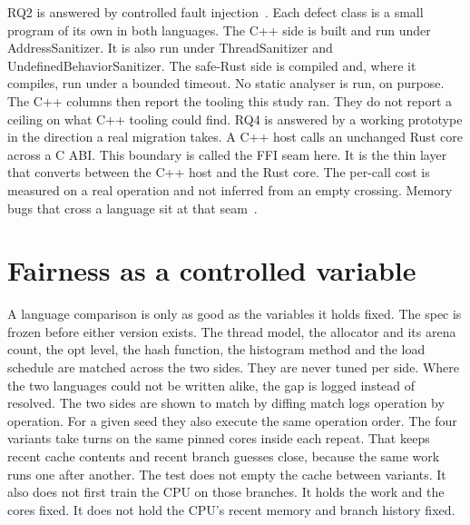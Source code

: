 \documentclass[english,oneside,a4paper,censored,csm,software-track-2020]{HYthesisML}
\begin{document}
RQ2 is answered by controlled fault injection~\cite{natella2016fault}. Each
defect class is a small program of its own in both languages.
The C++ side is built and run under AddressSanitizer. It is also run under
ThreadSanitizer and UndefinedBehaviorSanitizer. The safe-Rust side is compiled
and, where it compiles, run under a bounded timeout. No static analyser is
run, on purpose.
The C++ columns then report the tooling this study ran. They do not report a
ceiling on what C++ tooling could find. RQ4 is answered by a working
prototype in the direction a real migration takes. A C++ host calls an
unchanged Rust core across a C ABI. This boundary is called the FFI seam here.
It is the thin layer that converts between the C++ host and the Rust core.
The per-call cost is measured on a real
operation and not inferred from an empty crossing. Memory bugs that cross a
language sit at that seam~\cite{li2022crosslang}.

\section{Fairness as a controlled variable}\label{sec:controlsbrief}
A language comparison is only as good as the variables it holds fixed. The
spec is frozen before either version exists. The thread model, the allocator
and its arena count, the opt level, the hash function, the histogram method
and the load schedule are matched across the two sides. They are never tuned
per side. Where the two languages could not be written alike, the gap is
logged instead of resolved. The two sides are shown to match by diffing match
logs operation by operation. For a given seed they also execute the same
operation order. The four variants take turns on the same pinned cores
inside each repeat. That keeps recent cache contents and recent branch
guesses close, because the same work runs one after another. The test does
not empty the cache between variants. It also does not first train the CPU
on those branches. It holds the work and the cores fixed. It does not hold
the CPU's recent memory and branch history fixed.
\end{document}
